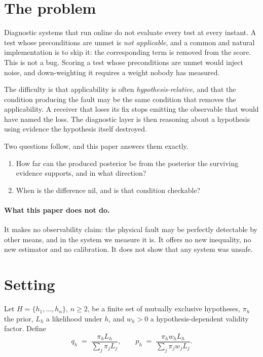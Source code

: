 \documentclass[11pt,a4paper]{article}
\theoremstyle{definition}
\begin{document}
\section{The problem}

Diagnostic systems that run online do not evaluate every test at every
instant. A test whose preconditions are unmet is \emph{not applicable}, and a
common and natural implementation is to skip it: the corresponding term is
removed from the score. This is not a bug. Scoring a test whose preconditions
are unmet would inject noise, and down-weighting it requires a weight nobody
has measured.

The difficulty is that applicability is often \emph{hypothesis-relative}, and
that the condition producing the fault may be the same condition that removes
the applicability. A receiver that loses its fix stops emitting the observable
that would have named the loss. The diagnostic layer is then reasoning about a
hypothesis using evidence the hypothesis itself destroyed.

Two questions follow, and this paper answers them exactly.

\begin{enumerate}
\item How far can the produced posterior be from the posterior the surviving
      evidence supports, and in what direction?
\item When is the difference nil, and is that condition checkable?
\end{enumerate}

\paragraph{What this paper does not do.} It makes no observability claim: the
physical fault may be perfectly detectable by other means, and in the system we
measure it is. It offers no new inequality, no new estimator and no
calibration. It does not show that any system was unsafe.

\section{Setting}
\label{sec:setting}

Let $H=\{h_1,\dots,h_n\}$, $n\ge 2$, be a finite set of mutually exclusive
hypotheses, $\pi_h$ the prior, $L_h$ a likelihood under $h$, and $w_h>0$ a
hypothesis-dependent validity factor. Define
\begin{equation}
q_h \;=\; \frac{\pi_h L_h}{\sum_j \pi_j L_j},
\qquad
p_h \;=\; \frac{\pi_h w_h L_h}{\sum_j \pi_j w_j L_j}.
\label{eq:qp}
\end{equation}
\end{document}
